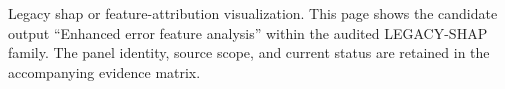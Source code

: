 Legacy shap or feature-attribution visualization. This page shows the candidate output ``Enhanced error feature analysis'' within the audited LEGACY-SHAP family. The panel identity, source scope, and current status are retained in the accompanying evidence matrix.
